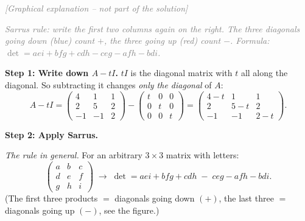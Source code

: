 \documentclass[a4paper,12pt]{article}
\newcommand{\grafik}{\textcolor{gray}{\small\textit{[Graphical explanation -- not part of the solution]}}}
\begin{document}
\grafik

\begin{center}
\end{center}

\textcolor{gray}{\small\textit{Sarrus rule: write the first two columns again on the right. The three diagonals going \emph{down} (blue) count $+$, the three going \emph{up} (red) count $-$. Formula: $\det = aei + bfg + cdh - ceg - afh - bdi$.}}

\textbf{Step 1: Write down $A - tI$.} $tI$ is the diagonal matrix with $t$ all along the diagonal. So subtracting it changes \emph{only the diagonal} of $A$:
\[
A - tI = \begin{pmatrix} 4 & 1 & 1 \\ 2 & 5 & 2 \\ -1 & -1 & 2 \end{pmatrix} - \begin{pmatrix} t & 0 & 0 \\ 0 & t & 0 \\ 0 & 0 & t \end{pmatrix} = \begin{pmatrix} 4-t & 1 & 1 \\ 2 & 5-t & 2 \\ -1 & -1 & 2-t \end{pmatrix}.
\]

\textbf{Step 2: Apply Sarrus.}

\emph{The rule in general.} For an arbitrary $3\times3$ matrix with letters:
\[
\begin{pmatrix} a & b & c \\ d & e & f \\ g & h & i \end{pmatrix}
\;\longrightarrow\;
\det = aei + bfg + cdh \;-\; ceg - afh - bdi.
\]
(The first three products $=$ diagonals going down $(+)$, the last three $=$ diagonals going up $(-)$, see the figure.)
\end{document}
